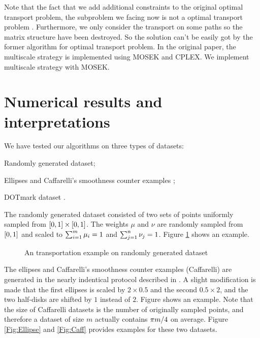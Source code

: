 \documentclass[english]{pkupaper}
\begin{document}
Note that the fact that we add additional constraints to the original optimal transport problem, the subproblem we facing now is not a optimal transport problem . Furthermore, we only consider the transport on some paths so the matrix structure have been destroyed. So the solution can't be easily got by the former algorithm for optimal transport problem. In the original paper, the multiscale strategy is implemented using MOSEK and CPLEX. We implement multiscale strategy with MOSEK.

\section{Numerical results and interpretations} \label{Sec:NumRes}

We have tested our algorithms on three types of datasets:
\begin{partlist}
\item Randomly generated dataset;
\item Ellipses and Caffarelli's smoothness counter examples \parencite{Gerber2017};
\item DOTmark dataset \parencite{Schrieber2017}.
\end{partlist}

The randomly generated dataset consisted of two sets of points uniformly sampled from $ \left[  0, 1  \right] \times \left[  0, 1  \right] $. The weights $\mu$ and $\nu$ are randomly sampled from $ \left[  0, 1  \right] $ and scaled to $ \sum_{ {i} = {1} }^{m}{\mu_i} = 1 $ and $ \sum_{ {j} = {1} }^{n}{\nu_j} = 1 $. Figure \ref{Fig:Random} shows an example.

\begin{figure}
\centering \scalebox{0.65}{}
\caption{An transportation example on randomly generated dataset} \label{Fig:Random}
\end{figure}

The ellipses and Caffarelli's smoothness counter examples (Caffarelli) are generated in the nearly indentical protocol described in \parencite{Gerber2017}. A slight modification is made that the first ellipses is scaled by $ 2 \times 0.5 $ and the second $ 0.5 \times 2 $, and the two half-disks are shifted by $1$ instead of $2$. Figure shows an example. Note that the size of Caffarelli datasets is the number of originally sampled points, and therefore a dataset of size $m$ actually contains $ \pi m / 4 $ on average. Figure \ref{Fig:Ellipse} and \ref{Fig:Caff} provides examples for these two datasets.
\end{document}

